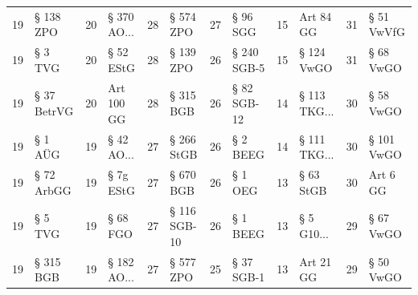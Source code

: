 \begin{tabular}{rlrlrlrlrlrl}
 19 &    § 138 ZPO &  20 &  § 370 AO... &  28 &     § 574 ZPO &  27 &    § 96 SGG &     15 &       Art 84 GG &     31 & § 51 VwVfG \\
 19 &      § 3 TVG &  20 &      § 52 EStG &  28 &     § 139 ZPO &  26 & § 240 SGB-5 &     15 &      § 124 VwGO &     31 &  § 68 VwGO \\
 19 &  § 37 BetrVG &  20 &     Art 100 GG &  28 &     § 315 BGB &  26 & § 82 SGB-12 &     14 &  § 113 TKG... &     30 &  § 58 VwGO \\
 19 &      § 1 AÜG &  19 &   § 42 AO... &  27 &    § 266 StGB &  26 &    § 2 BEEG &     14 &  § 111 TKG... &     30 & § 101 VwGO \\
 19 &   § 72 ArbGG &  19 &      § 7g EStG &  27 &     § 670 BGB &  26 &     § 1 OEG &     13 &       § 63 StGB &     30 &   Art 6 GG \\
 19 &      § 5 TVG &  19 &       § 68 FGO &  27 &  § 116 SGB-10 &  26 &    § 1 BEEG &     13 &    § 5 G10... &     29 &  § 67 VwGO \\
 19 &    § 315 BGB &  19 &  § 182 AO... &  27 &     § 577 ZPO &  25 &  § 37 SGB-1 &     13 &       Art 21 GG &     29 &  § 50 VwGO \\

\end{tabular}
